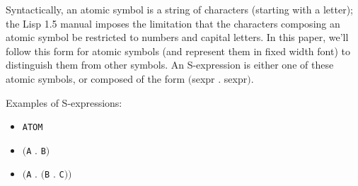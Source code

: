 \documentclass[10pt]{article}
\begin{document}
Syntactically, an atomic symbol is a string of characters (starting
with a letter); the Lisp 1.5 manual imposes the limitation that the
characters composing an atomic symbol be restricted to numbers and
capital letters. In this paper, we'll follow this form for atomic
symbols (and represent them in fixed width font) to distinguish them
from other symbols. An S-expression is either one of these atomic
symbols, or composed of the form $($sexpr . sexpr$)$.

Examples of S-expressions:

\begin{itemize}
  \item \verb|ATOM|
  \item $($\verb|A| . \verb|B|$)$
  \item $($\verb|A| . $($\verb|B| . \verb|C|$))$
\end{itemize}


\end{document}
